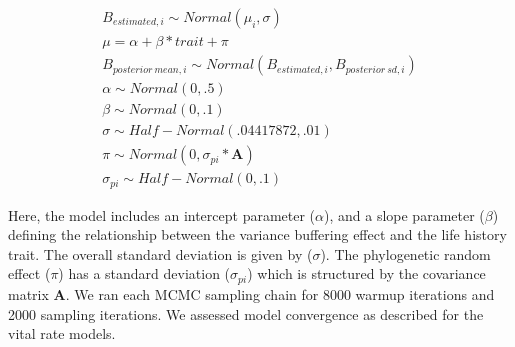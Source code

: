\documentclass[12pt]{article}
\begin{document}
\begin{subequations}
	\begin{align}
		B_{estimated,i} \sim Normal(\mu_i,\sigma)\\
		\mu = \alpha + \beta*trait + \pi \\
		B_{posterior\ mean,i} \sim Normal(B_{estimated,i}, B_{posterior\ sd,i})\\
		\alpha \sim Normal(0,.5)\\
		\beta \sim Normal(0,.1)\\
		\sigma \sim Half-Normal(.04417872,.01)\\
		\pi \sim Normal(0,\sigma_{pi}*\mathbf{A})\\
		\sigma_{pi} \sim Half-Normal(0,.1)
	\end{align}
\end{subequations}

Here, the model includes an intercept parameter ($\alpha$), and a slope parameter ($\beta$) defining the relationship between the variance buffering effect and the life history trait. 
The overall standard deviation is given by ($\sigma$). 
The phylogenetic random effect ($\pi$) has a standard deviation ($\sigma_{pi}$) which is structured by the covariance matrix \textbf{A}.
We ran each MCMC sampling chain for 8000 warmup iterations and 2000 sampling iterations. 
We assessed model convergence as described for the vital rate models.
 








\clearpage
\end{document}
